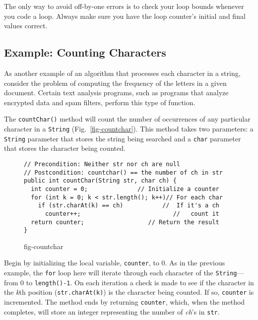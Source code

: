 The only way to avoid off-by-one errors is to check your loop bounds
whenever you code a loop.  Always make sure you have the loop counter's
initial and final values correct.


\subsection{Example: Counting Characters}
\noindent As another example of an algorithm that processes
each character in a string, consider the problem of computing the
frequency of the letters in a given document.  Certain text analysis
programs, such as programs that analyze encrypted data and spam
filters, perform this type of function. 


The {\tt countChar()} method will count the number of occurrences of
any particular character in a {\tt String}
(Fig.~\ref{fig-countchar}).  This method takes two parameters: a
{\tt String} parameter that stores the string being searched and a
{\tt char} parameter that stores the character being counted.

\begin{figure}[h!]
\jjjprogstart
\begin{jjjlisting}
\begin{lstlisting}
// Precondition: Neither str nor ch are null
// Postcondition: countchar() == the number of ch in str
public int countChar(String str, char ch) {
  int counter = 0;              // Initialize a counter
  for (int k = 0; k < str.length(); k++)// For each char
    if (str.charAt(k) == ch)           //  If it's a ch
      counter++;                          //   count it
  return counter;                  // Return the result
}
\end{lstlisting}
\end{jjjlisting}
{fig-countchar}
\end{figure}

Begin by initializing the local variable, {\tt counter}, to
0. As in the previous example, the {\tt for} loop here will iterate through
each character of the {\tt String}---from 0 to {\tt length()-1}.  On
each iteration a check is made to see if the character in the {\it k}th
position ({\tt str.charAt(k)}) is the character being counted.  If so,
{\tt counter} is incremented.  The method ends by returning
{\tt counter}, which, when the method completes, will store an integer
representing the number of {\it ch}'s in {\tt str}.


